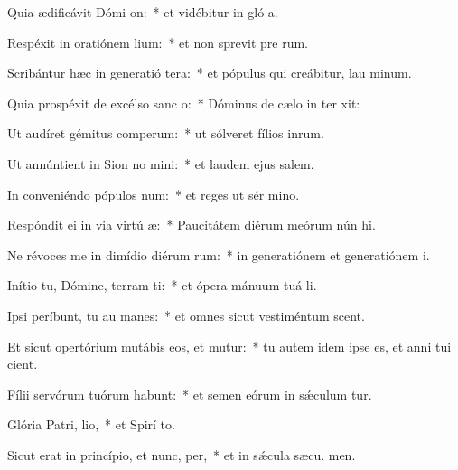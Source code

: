 \item Quia ædificávit Dómi on:~* et vidébitur in gló a.
\item Respéxit in oratiónem lium:~* et non sprevit pre rum.
\item Scribántur hæc in generatió tera:~* et pópulus qui creábitur, lau minum.
\item Quia prospéxit de excélso sanc o:~* Dóminus de cælo in ter xit:
\item Ut audíret gémitus comperum:~* ut sólveret fílios inrum.
\item Ut annúntient in Sion no mini:~* et laudem ejus  salem.
\item In conveniéndo pópulos  num:~* et reges ut sér mino.
\item Respóndit ei in via virtú æ:~* Paucitátem diérum meórum nún hi.
\item Ne révoces me in dimídio diérum rum:~* in generatiónem et generatiónem  i.
\item Inítio tu, Dómine, terram ti:~* et ópera mánuum tuá  li.
\item Ipsi períbunt, tu au manes:~* et omnes sicut vestiméntum scent.
\item Et sicut opertórium mutábis eos, et mutur:~* tu autem idem ipse es, et anni tui  cient.
\item Fílii servórum tuórum habunt:~* et semen eórum in sǽculum tur.
\item Glória Patri,  lio,~* et Spirí to.
\item Sicut erat in princípio, et nunc,  per,~* et in sǽcula sæcu. men.
